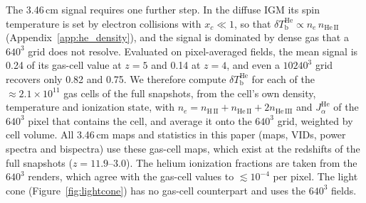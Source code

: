 


The 3.46\,cm signal requires one further step. In the diffuse IGM its spin temperature is set by electron collisions with $x_c \ll 1$, so that $\delta T_\mathrm{b}^\mathrm{He} \propto n_e\,n_\mathrm{He\,II}$ (Appendix~\ref{app:he_density}), and the signal is dominated by dense gas that a $640^3$ grid does not resolve. Evaluated on pixel-averaged fields, the mean signal is 0.24 of its gas-cell value at $z = 5$ and 0.14 at $z = 4$, and even a $10240^3$ grid recovers only 0.82 and 0.75. We therefore compute $\delta T_\mathrm{b}^\mathrm{He}$ for each of the $\approx 2.1\times10^{11}$ gas cells of the \lumina full snapshots, from the cell's own density, temperature and ionization state, with $n_e = n_\mathrm{H\,II} + n_\mathrm{He\,II} + 2n_\mathrm{He\,III}$ and $J_\alpha^\mathrm{He}$ of the $640^3$ pixel that contains the cell, and average it onto the $640^3$ grid, weighted by cell volume. All 3.46\,cm maps and statistics in this paper (maps, VIDs, power spectra and bispectra) use these gas-cell maps, which exist at the redshifts of the full snapshots ($z = 11.9$--3.0). The helium ionization fractions are taken from the $640^3$ renders, which agree with the gas-cell values to $\lesssim 10^{-4}$ per pixel. The light cone (Figure~\ref{fig:lightcone}) has no gas-cell counterpart and uses the $640^3$ fields.



